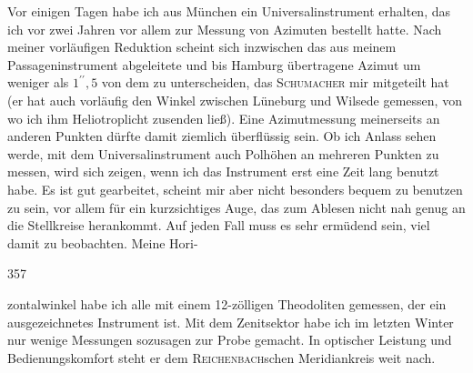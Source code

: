 \par\noindent\hspace*{\parindent}Vor einigen Tagen habe ich aus München ein Universalinstrument erhalten, das ich vor zwei Jahren vor allem zur Messung von Azimuten bestellt hatte.
Nach meiner vorläufigen Reduktion scheint sich inzwischen das aus meinem Passageninstrument abgeleitete und bis Hamburg übertragene Azimut um weniger als \(1^{\prime\prime}{,}5\) von dem zu unterscheiden, das \textsc{Schumacher} mir mitgeteilt hat (er hat auch vorläufig den Winkel zwischen Lüneburg und Wilsede gemessen, von wo ich ihm Heliotroplicht zusenden ließ). Eine Azimutmessung meinerseits an anderen Punkten dürfte damit ziemlich überflüssig sein.
Ob ich Anlass sehen werde, mit dem Universalinstrument auch Polhöhen an mehreren Punkten zu messen, wird sich zeigen, wenn ich das Instrument erst eine Zeit lang benutzt habe.
Es ist gut gearbeitet, scheint mir aber nicht besonders bequem zu benutzen zu sein, vor allem für ein kurzsichtiges Auge, das zum Ablesen nicht nah genug an die Stellkreise herankommt.
Auf jeden Fall muss es sehr ermüdend sein, viel damit zu beobachten.
Meine Hori-
\par\clearpage
{}\hfill357\par\medskip
\noindent zontalwinkel habe ich alle mit einem 12-zölligen Theodoliten gemessen, der ein ausgezeichnetes Instrument ist.
Mit dem Zenitsektor habe ich im letzten Winter nur wenige Messungen sozusagen zur Probe gemacht. In optischer Leistung und Bedienungskomfort steht er dem \textsc{Reichenbach}schen Meridiankreis weit nach.

